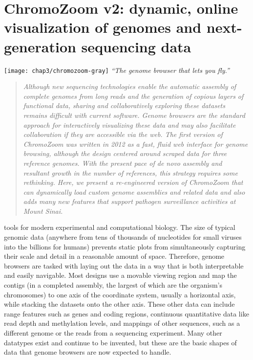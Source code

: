 
\chapter{ChromoZoom v2: dynamic, online visualization of genomes and next-generation sequencing data}
\label{chap:chromozoom}

\begin{marginfigure}[1cm]
  \texttt{[image: chap3/chromozoom-gray]}
  \emph{``The genome browser that lets you fly.''}
\end{marginfigure}

\begin{quote}
\emph{Although new sequencing technologies enable the automatic assembly of complete genomes from long reads and the generation of copious layers of functional data, sharing and collaboratively exploring these datasets remains difficult with current software. Genome browsers are the standard approach for interactively visualizing these data and may also facilitate collaboration if they are accessible via the web. The first version of ChromoZoom was written in 2012 as a fast, fluid web interface for genome browsing, although the design centered around scraped data for three reference genomes. With the present pace of \emph{de novo} assembly and resultant growth in the number of references, this strategy requires some rethinking. Here, we present a re-engineered version of ChromoZoom that can dynamically load custom genome assemblies and related data and also adds many new features that support pathogen surveillance activities at Mount Sinai.}
\end{quote}

 tools for modern experimental and computational biology. The size of typical genomic data (anywhere from tens of thousands of nucleotides for small viruses into the billions for humans) prevents static plots from simultaneously capturing their scale and detail in a reasonable amount of space. Therefore, genome browsers are tasked with laying out the data in a way that is both interpretable and easily navigable. Most designs use a movable viewing region and map the contigs (in a completed assembly, the largest of which are the organism's chromosomes) to one axis of the coordinate system, usually a horizontal axis, while stacking the datasets onto the other axis. These other data can include range features such as genes and coding regions, continuous quantitative data like read depth and methylation levels, and mappings of other sequences, such as a different genome or the reads from a sequencing experiment. Many other datatypes exist and continue to be invented, but these are the basic shapes of data that genome browsers are now expected to handle.

